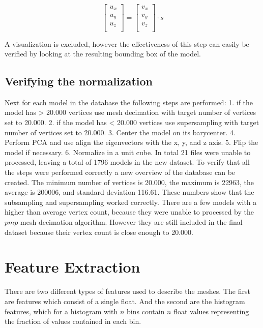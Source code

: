 \documentclass{bigdata}
\begin{document}
\[
\begin{bmatrix}
u_x \\
u_y \\
u_z \\
\end{bmatrix}
=
\begin{bmatrix}
v_x \\
v_y \\
v_z \\
\end{bmatrix}
\cdot s
\]

A visualization is excluded, however the effectiveness of this step can easily be verified by looking at the resulting bounding box of the model.

\newpage

\subsection{Verifying the normalization}
Next for each model in the database the following steps are performed: 
1. if the model has > 20.000 vertices use mesh decimation with target number of vertices set to 20.000.
2. if the model has < 20.000 vertices use supersampling with target number of vertices set to 20.000.
3. Center the model on its barycenter.
4. Perform PCA and use align the eigenvectors with the x, y, and z axis.
5. Flip the model if necessary.
6. Normalize in a unit cube.
In total 21 files were unable to processed, leaving a total of 1796 models in the new dataset. To verify that all the steps were performed correctly a new overview of the database can be created. The minimum number of vertices is 20.000, the maximum is 22963, the average is 200006, and standard deviation 116.61. These numbers show that the subsampling and supersampling worked correctly. There are a few models with a higher than average vertex count, because they were unable to processed by the $pmp$ mesh decimation algorithm. However they are still included in the final dataset because their vertex count is close enough to 20.000.

\section{Feature Extraction}

There are two different types of features used to describe the meshes. The first are  features which consist of a single float. And the second are the histogram features, which for a histogram with $n$ bins contain $n$ float values representing the fraction of values contained in each bin. 
\end{document}
